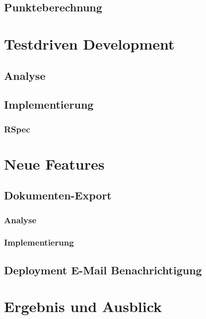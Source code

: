 \documentclass[12pt,             %
               a4paper,          %
               listof=totoc,     %
               index=totoc,      %
               bibliography=totoc,%
               oneside,         %
               BCOR1cm,          %
               english   %
               ]{scrbook}
\begin{document}
\section{Punkteberechnung}

\clearpage
\chapter{Testdriven Development}
\section{Analyse}
\section{Implementierung}
\subsection{RSpec}

\chapter{Neue Features}
\section{Dokumenten-Export}
\subsection{Analyse}
\subsection{Implementierung}
\clearpage
\section{Deployment E-Mail Benachrichtigung}


\chapter{Ergebnis und Ausblick}
\end{document}
